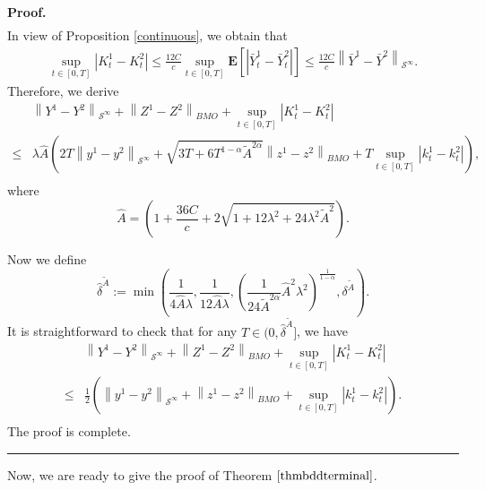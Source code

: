 \documentclass[10pt]{article}%
\numberwithin{equation}{section}
\newenvironment{proof}[1][Proof]{\noindent \textbf{#1.} }{\  \rule{0.5em}{0.5em}}
\begin{document}
\begin{proof}
$$\begin{aligned}
\end{aligned}
$$
In view of Proposition \ref{continuous}, we obtain that
$$
\begin{aligned}
\sup_{t \in[0, T]}\left|K^1_{t}-K^2_{t}\right|
\leq \frac{12C}{c}\sup_{t \in[0, T]}\mathbf{E}\left[\left|\bar{Y}^1_t-\bar{Y}^2_t\right|\right]\leq \frac{12C}{c}\left\|\bar{Y}^1-\bar{Y}^2\right\|_{\mathcal{S}^{\infty}}.
\end{aligned}		
$$
Therefore, we derive 
\begin{equation}\label{contraction}\begin{split}
   &\left\|Y^1-Y^2\right\|_{\mathcal{S}^{\infty}}+\left\|Z^1-Z^2\right\|_{BMO}+\sup_{t \in[0, T]}\left|K^1_{t}-K^2_{t}\right|\\
   \leq &\lambda \hat{A} \left(2T\left\|y^1-y^2\right\|_{\mathcal{S}^{\infty}}+\sqrt{3T+6T^{1-\alpha}\tilde{A}^{2\alpha}}\left\|z^1-z^2\right\|_{BMO}+T\sup_{t\in[0,T]}\left|k^1_t-k^2_t\right|\right),\\
\end{split}   
\end{equation}
where $$\hat{A}=\left(1+\frac{36C}{c}+2\sqrt{1+12\lambda^2+24\lambda^2\tilde{A}^2}\right).$$

Now we define
\begin{equation}\label{delta}
  \hat{\delta}^{\tilde{A}}:=\min\left(\frac{1}{4\hat{A}\lambda}, \frac{1}{12\hat{A}\lambda}, \left(\frac{1}{24\tilde{A}^{2\alpha}}\hat{A}^2\lambda^2\right)^{\frac{1}{1-\alpha}},\delta^{\tilde{A}}\right). 
\end{equation}
It is straightforward to check that for any $T\in(0,\hat{\delta}^{\tilde{A}}]$, we have
$$\begin{aligned}
  &\left\|Y^1-Y^2\right\|_{\mathcal{S}^{\infty}}+\left\|Z^1-Z^2\right\|_{BMO}+\sup_{t \in[0, T]}\left|K^1_{t}-K^2_{t}\right|\\
   \leq&\frac{1}{2}\left(\left\|y^1-y^2\right\|_{\mathcal{S}^{\infty}}+\left\|z^1-z^2\right\|_{BMO}+\sup_{t\in[0,T]}\left|k^1_t-k^2_t\right|\right).\\  
\end{aligned}$$
The proof is complete.
\end{proof}

Now, we are ready to give the proof of Theorem $\ref{thmbddterminal}$.
\end{document}
